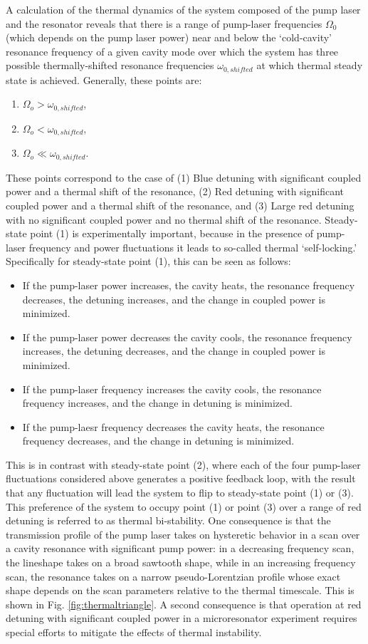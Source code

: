 A calculation of the thermal dynamics of the system composed of the pump laser and the resonator reveals that there is a range of pump-laser frequencies $\Omega_0$ (which depends on the pump laser power) near and below the `cold-cavity' resonance frequency of a given cavity mode over which the system has three possible thermally-shifted resonance frequencies $\omega_{0,shifted}$ at which thermal steady state is achieved. Generally, these points are\cite{Carmon2004}:
\begin{enumerate}
\item $\Omega_o>\omega_{0,shifted}$,
\item $\Omega_o<\omega_{0,shifted}$,
\item $\Omega_o\ll\omega_{0,shifted}$.
\end{enumerate}
These points correspond to the case of (1) Blue detuning with significant coupled power and a thermal shift of the resonance, (2) Red detuning with significant coupled power and a thermal shift of the resonance, and (3) Large red detuning with no significant coupled power and no thermal shift of the resonance. Steady-state point (1) is experimentally important, because in the presence of pump-laser frequency and power fluctuations it leads to so-called thermal `self-locking.' Specifically for steady-state point (1), this can be seen as follows: 
\begin{itemize}
	\item If the pump-laser power increases, the cavity heats, the resonance frequency decreases, the detuning increases, and the change in coupled power is minimized.
	\item If the pump-laser power decreases the cavity cools, the resonance frequency increases, the detuning decreases, and the change in coupled power is minimized.
	\item If the pump-laser frequency increases the cavity cools, the resonance frequency increases, and the change in detuning is minimized.
	\item If the pump-laesr frequency decreases the cavity heats, the resonance frequency decreases, and the change in detuning is minimized.
	\end{itemize}
This is in contrast with steady-state point (2), where each of the four pump-laser fluctuations considered above generates a positive feedback loop, with the result that any fluctuation will lead the system to flip to steady-state point (1) or (3). This preference of the system to occupy point (1) or point (3) over a range of red detuning is referred to as thermal bi-stability. One consequence is that the transmission profile of the pump laser takes on hysteretic behavior in a scan over a cavity resonance with significant pump power: in a decreasing frequency scan, the lineshape takes on a broad sawtooth shape, while in an increasing frequency scan, the resonance takes on a narrow pseudo-Lorentzian profile whose exact shape depends on the scan parameters relative to the thermal timescale. This is shown in Fig. \ref{fig:thermaltriangle}. \color{red}A second consequence is that operation at red detuning with significant coupled power in a microresonator experiment requires special efforts to mitigate the effects of thermal instability.\color{black}
